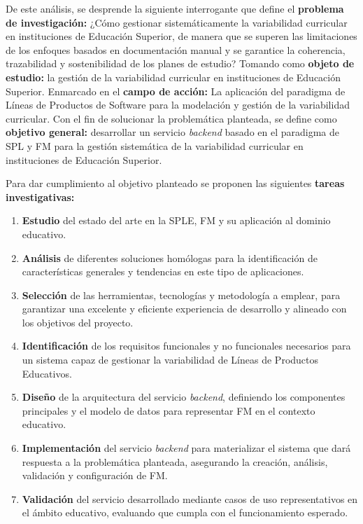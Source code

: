 De este análisis, se desprende la siguiente interrogante que define el
\textbf{problema de investigación:}
¿Cómo gestionar sistemáticamente la variabilidad curricular en instituciones de 
Educación Superior, de manera que se superen las limitaciones de los enfoques basados 
en documentación manual y se garantice la coherencia, trazabilidad y 
sostenibilidad de los planes de estudio?
Tomando como \textbf{objeto de estudio:} 
la gestión de la variabilidad curricular en instituciones de Educación Superior.
Enmarcado en el \textbf{campo de acción:}
La aplicación del paradigma de Líneas de Productos de Software para la 
modelación y gestión de la variabilidad curricular.
Con el fin de solucionar la problemática planteada, se define como \textbf{objetivo general:}
desarrollar un servicio \textit{backend} basado en el paradigma de \ac{SPL} y \ac{FM} para la gestión sistemática 
de la variabilidad curricular en instituciones de Educación Superior.

Para dar cumplimiento al objetivo planteado se proponen las siguientes \textbf{tareas investigativas:}
\begin{enumerate}
    \item \textbf{Estudio} del estado del arte en la \ac{SPLE}, \ac{FM} y su
    aplicación al dominio educativo.
    \item \textbf{Análisis} de diferentes soluciones homólogas para la identificación de características
    generales y tendencias en este tipo de aplicaciones.
    \item \textbf{Selección} de las herramientas, tecnologías y metodología a emplear, para garantizar
    una excelente y eficiente experiencia de desarrollo y alineado con los objetivos del proyecto.
    \item \textbf{Identificación} de los requisitos funcionales y no funcionales necesarios para un
    sistema capaz de gestionar la variabilidad de Líneas de Productos Educativos.
    \item \textbf{Diseño} de la arquitectura del servicio \textit{backend}, definiendo los
    componentes principales  y el modelo de datos para
    representar \ac{FM} en el contexto educativo.
    \item \textbf{Implementación} del servicio \textit{backend} para materializar el sistema que dará respuesta
    a la problemática planteada, asegurando la creación, análisis, validación y configuración de \ac{FM}.
    \item \textbf{Validación} del servicio desarrollado mediante casos de uso representativos
    en el ámbito educativo, evaluando que cumpla con el funcionamiento esperado.
\end{enumerate}

